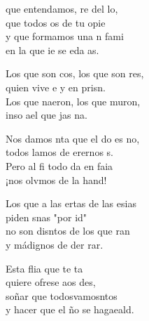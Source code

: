 \begin{cancion}%
	 que entendamos, re del lo,\\
	que todos os de tu opie \\
	y que formamos una n fami \\
	en la que ie se eda as.\jump\\
	\begin{chorus}%
		Los que son cos, los que son res,\\
		quien vive e y en prisn.\\
		Los que naeron, los que muron,\\
		inso ael que jas na.\jump\\
	\end{chorus}%
	Nos damos nta que el do es no,\\
	todos lamos de erernos s.\\
	Pero al fi todo da en faia\\
	¡nos olvmos de la hand!\jump\\
	\begin{chorus}%
		Los que a las ertas de las esias\\
		piden snas "por i\chord{Do}{}{da}d"\\
		no son disntos de los que ran\\
		y  mádignos de der rar.\jump\\
	\end{chorus}%
	Esta flia que  te ta\\
	quiere ofrese aos des,\\
	soñar que todosvamosntos\\
	y hacer que el ño se hagaeald.\jump\\

\end{cancion}
